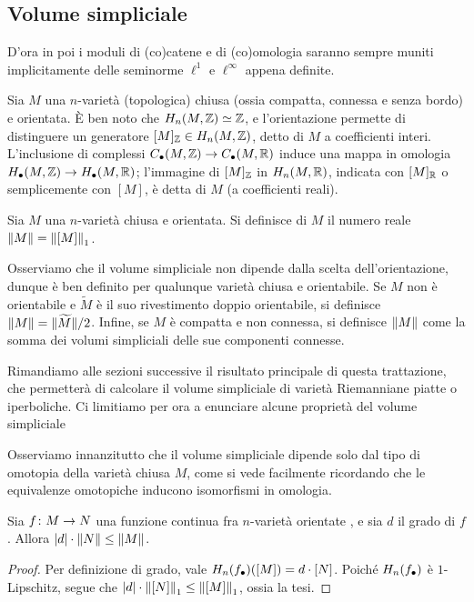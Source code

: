 \subsection{Volume simpliciale}
D'ora in poi i moduli di (co)catene e di (co)omologia saranno sempre muniti implicitamente delle seminorme $\ell^1$ e $\ell^\infty$ appena definite.

Sia $M$ una $n$-varietà (topologica) chiusa (ossia compatta, connessa e senza bordo) e orientata. È ben noto che $H_n(M,\mathbb{Z})\simeq\mathbb{Z}$, e l'orientazione permette di distinguere un generatore $[M]_{\mathbb{Z}}\in H_n(M,\mathbb{Z})$, detto  di $M$ a coefficienti interi. L'inclusione di complessi $C_\bullet(M,\mathbb{Z})\to C_\bullet(M,\mathbb{R})$ induce una mappa in omologia $H_\bullet(M,\mathbb{Z})\to H_\bullet(M,\mathbb{R})$; l'immagine di $[M]_{\mathbb{Z}}$ in $H_n(M,\mathbb{R})$, indicata con $[M]_{\mathbb{R}}$ o semplicemente con $[M]$, è detta  di $M$ (a coefficienti reali).

\begin{definition}
Sia $M$ una $n$-varietà chiusa e orientata. Si definisce  di $M$ il numero reale $\left\lVert M\right\rVert=\left\lVert [M]\right\rVert_1$.
\end{definition}
Osserviamo che il volume simpliciale non dipende dalla scelta dell'orientazione, dunque è ben definito per qualunque varietà chiusa e orientabile. Se $M$ non è orientabile e $\widetilde M$ è il suo rivestimento doppio orientabile, si definisce $\left\lVert M\right\rVert=\lVert\widetilde M\rVert/2$. Infine, se $M$ è compatta e non connessa, si definisce $\left\lVert M\right\rVert$ come la somma dei volumi simpliciali delle sue componenti connesse.

Rimandiamo alle sezioni successive il risultato principale di questa trattazione, che permetterà di calcolare il volume simpliciale di varietà Riemanniane piatte o iperboliche. Ci limitiamo per ora a enunciare alcune proprietà del volume simpliciale

Osserviamo innanzitutto che il volume simpliciale dipende solo dal tipo di omotopia della varietà chiusa $M$, come si vede facilmente ricordando che le equivalenze omotopiche inducono isomorfismi in omologia.

\begin{proposition}
Sia $\map{f}{M}{N}$ una funzione continua fra $n$-varietà orientate , e sia $d$ il grado di $f$. Allora $|d|\cdot\left\lVert N\right\rVert\le\left\lVert M\right\rVert$.
\end{proposition}
\begin{proof}
Per definizione di grado, vale $H_n(f_\bullet)([M])=d\cdot[N]$. Poiché $H_n(f_\bullet)$ è $1$-Lipschitz, segue che $|d|\cdot\left\lVert [N]\right\rVert_1\le\left\lVert [M]\right\rVert_1$, ossia la tesi.
\end{proof}

